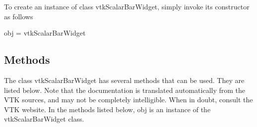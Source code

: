 To create an instance of class vtk\-Scalar\-Bar\-Widget, simply invoke its constructor as follows \begin{DoxyVerb}  obj = vtkScalarBarWidget
\end{DoxyVerb}
 \hypertarget{vtkwidgets_vtkxyplotwidget_Methods}{}\subsection{Methods}\label{vtkwidgets_vtkxyplotwidget_Methods}
The class vtk\-Scalar\-Bar\-Widget has several methods that can be used. They are listed below. Note that the documentation is translated automatically from the V\-T\-K sources, and may not be completely intelligible. When in doubt, consult the V\-T\-K website. In the methods listed below, {\ttfamily obj} is an instance of the vtk\-Scalar\-Bar\-Widget class. 
